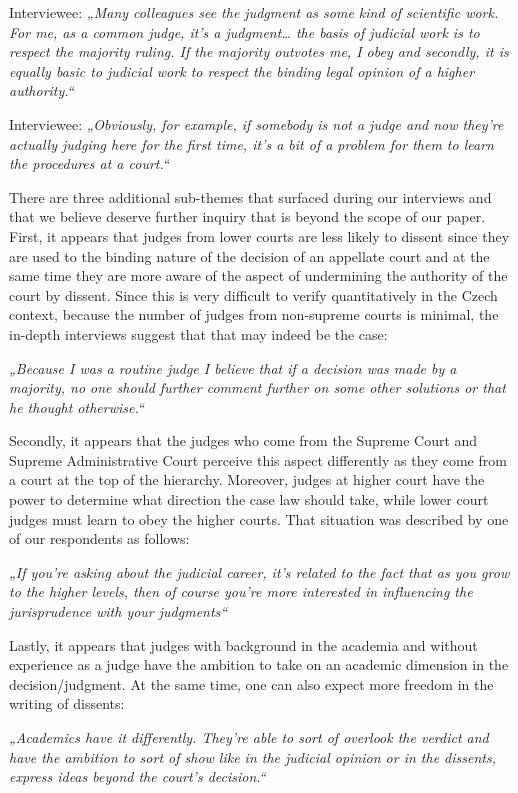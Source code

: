 \documentclass[
  11pt,
]{article}
\begin{document}
Interviewee: \emph{„Many colleagues see the judgment as some kind of scientific work. For me, as a common judge, it's a judgment\ldots{} the basis of judicial work is to respect the majority ruling. If the majority outvotes me, I obey and secondly, it is equally basic to judicial work to respect the binding legal opinion of a higher authority.``}

Interviewee: \emph{„Obviously, for example, if somebody is not a judge and now they're actually judging here for the first time, it's a bit of a problem for them to learn the procedures at a court.``}

There are three additional sub-themes that surfaced during our interviews and that we believe deserve further inquiry that is beyond the scope of our paper. First, it appears that judges from lower courts are less likely to dissent since they are used to the binding nature of the decision of an appellate court and at the same time they are more aware of the aspect of undermining the authority of the court by dissent. Since this is very difficult to verify quantitatively in the Czech context, because the number of judges from non-supreme courts is minimal, the in-depth interviews suggest that that may indeed be the case:

\emph{„Because I was a routine judge I believe that if a decision was made by a majority, no one should further comment further on some other solutions or that he thought otherwise.``}

Secondly, it appears that the judges who come from the Supreme Court and Supreme Administrative Court perceive this aspect differently as they come from a court at the top of the hierarchy. Moreover, judges at higher court have the power to determine what direction the case law should take, while lower court judges must learn to obey the higher courts. That situation was described by one of our respondents as follows:

\emph{„If you're asking about the judicial career, it's related to the fact that as you grow to the higher levels, then of course you're more interested in influencing the jurisprudence with your judgments``}

Lastly, it appears that judges with background in the academia and without experience as a judge have the ambition to take on an academic dimension in the decision/judgment. At the same time, one can also expect more freedom in the writing of dissents:

\emph{„Academics have it differently. They're able to sort of overlook the verdict and have the ambition to sort of show like in the judicial opinion or in the dissents, express ideas beyond the court's decision.``}
\end{document}
